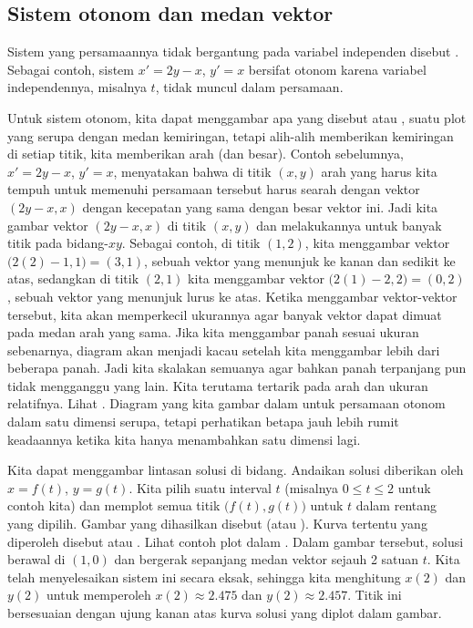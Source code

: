 \subsection{Sistem otonom dan medan vektor}

Sistem yang persamaannya tidak bergantung pada variabel independen
disebut \emph{}.  Sebagai contoh,
sistem $x'=2y-x$, $y'=x$ bersifat otonom karena
variabel independennya,
misalnya $t$, tidak muncul dalam persamaan.

Untuk sistem otonom, kita dapat menggambar apa yang disebut
\emph{} atau \emph{},
suatu plot yang serupa dengan medan kemiringan, tetapi
alih-alih memberikan kemiringan di setiap titik, kita memberikan arah (dan
besar).  Contoh sebelumnya, $x' = 2y-x$, $y' = x$, menyatakan
bahwa di titik $(x,y)$ arah yang harus kita tempuh untuk memenuhi
persamaan tersebut harus searah dengan vektor $( 2y-x, x )$
dengan kecepatan yang sama dengan besar vektor ini.  Jadi kita gambar
vektor $(2y-x,x)$ di titik $(x,y)$ dan melakukannya untuk
banyak titik pada bidang-$xy$.
Sebagai contoh, di titik $(1,2)$, kita menggambar vektor
$\bigl(2(2)-1,1\bigr) = (3,1)$,
sebuah vektor yang menunjuk ke kanan dan sedikit ke atas,
sedangkan di titik $(2,1)$ kita menggambar vektor $\bigl(2(1)-2,2\bigr) = (0,2)$,
sebuah vektor yang menunjuk lurus ke atas.
Ketika menggambar vektor-vektor tersebut, kita akan memperkecil
ukurannya agar banyak vektor dapat dimuat pada medan arah yang sama.
Jika kita menggambar panah sesuai ukuran sebenarnya, diagram akan menjadi
kacau setelah kita menggambar lebih dari beberapa panah.
Jadi kita skalakan semuanya agar bahkan panah terpanjang pun tidak mengganggu
yang lain.
Kita terutama
tertarik pada arah dan ukuran relatifnya.  Lihat
.
Diagram yang kita gambar dalam
untuk persamaan otonom dalam satu dimensi
serupa,
tetapi perhatikan betapa jauh lebih rumit keadaannya ketika kita
hanya menambahkan satu dimensi lagi.

Kita dapat menggambar lintasan solusi di bidang.  Andaikan
solusi diberikan oleh $x = f(t)$, $y=g(t)$.  Kita pilih suatu interval
$t$ (misalnya $0 \leq t \leq 2$ untuk contoh kita) dan memplot semua titik
$\bigl(f(t),g(t)\bigr)$ untuk $t$ dalam rentang yang dipilih.  Gambar yang dihasilkan
disebut \emph{}
(atau ).
Kurva tertentu yang diperoleh
disebut \emph{} atau \emph{}.
Lihat contoh plot dalam .
Dalam gambar tersebut, solusi berawal di $(1,0)$ dan bergerak sepanjang medan vektor
sejauh 2 satuan $t$.  Kita telah menyelesaikan sistem ini secara eksak, sehingga
kita menghitung $x(2)$ dan $y(2)$ untuk memperoleh
$x(2) \approx 2.475$ dan $y(2) \approx 2.457$.  Titik ini bersesuaian
dengan ujung kanan atas kurva solusi yang diplot dalam gambar.

